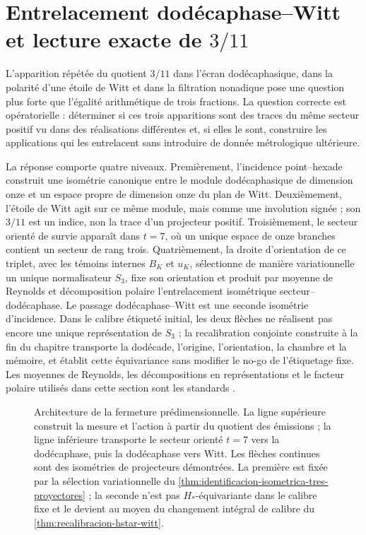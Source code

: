 \chapter{Entrelacement dodécaphase--Witt et lecture exacte de \texorpdfstring{\(3/11\)}{3/11}}
\label{chap:entrelazador-accion}

L'apparition répétée du quotient \(3/11\) dans l'écran dodécaphasique,
dans la polarité d'une étoile de Witt et dans la filtration nonadique pose
une question plus forte que l'égalité arithmétique de trois fractions. La
question correcte est opératorielle : déterminer si ces trois apparitions sont
des traces du même secteur positif vu dans des réalisations différentes et, si elles le
sont, construire les applications qui les entrelacent sans introduire de donnée
métrologique ultérieure.

La réponse comporte quatre niveaux. Premièrement, l'incidence point--hexade
construit une isométrie canonique entre le module dodécaphasique de dimension
onze et un espace propre de dimension onze du plan de Witt. Deuxièmement,
l'étoile de Witt agit sur ce même module, mais comme une involution
signée ; son \(3/11\) est un indice, non la trace d'un projecteur positif.
Troisièmement, le secteur orienté de survie apparaît dans \(t=7\), où un
unique espace de onze branches contient un secteur de rang trois. Quatrièmement, la
droite d'orientation de ce triplet, avec les témoins internes
\(B_K\) et \(u_K\), sélectionne de manière variationnelle un unique normalisateur
\(S_3\), fixe son orientation et produit par moyenne de Reynolds et
décomposition polaire l'entrelacement isométrique secteur--dodécaphase. Le
passage dodécaphase--Witt est une seconde isométrie d'incidence. Dans le calibre
étiqueté initial, les deux flèches ne réalisent pas encore une unique représentation
de \(S_3\) ; la recalibration conjointe construite à la fin du chapitre transporte
la dodécade, l'origine, l'orientation, la chambre et la mémoire, et établit cette
équivariance sans modifier le no-go de l'étiquetage fixe.
Les moyennes de Reynolds, les décompositions en représentations et le
facteur polaire utilisés dans cette section sont les standards
\cite{Serre1977Representations,HornJohnson2013}.

\begin{figure}[htbp]
\centering

\caption{Architecture de la fermeture prédimensionnelle. La ligne supérieure construit
la mesure et l'action à partir du quotient des émissions ; la ligne inférieure transporte
le secteur orienté \(t=7\) vers la dodécaphase, puis la dodécaphase vers
Witt. Les flèches continues sont des isométries de projecteurs démontrées. La
première est fixée par la sélection variationnelle du
\cref{thm:identificacion-isometrica-tres-proyectores} ; la seconde n'est pas
\(H_*\)-équivariante dans le calibre fixe et le devient au moyen du
changement intégral de calibre du \cref{thm:recalibracion-hstar-witt}.}
\label{fig:entrelazador-accion}
\end{figure}

